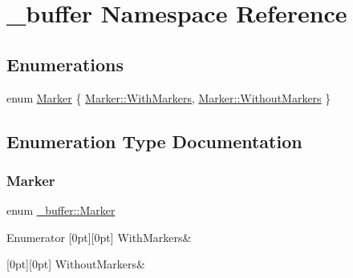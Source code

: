 \hypertarget{namespace__buffer}{}\section{\+\_\+buffer Namespace Reference}
\label{namespace__buffer}
\subsection*{Enumerations}
\begin{DoxyCompactItemize}
\item 
enum \hyperlink{namespace__buffer_ab9ca26b00f8b1794297a50a6356760cc}{Marker} \{ \newline
\hyperlink{namespace__buffer_ab9ca26b00f8b1794297a50a6356760cca716141cb6d114cdac427611aa530511d}{Marker\+::\+With\+Markers}, 
\newline
\hyperlink{namespace__buffer_ab9ca26b00f8b1794297a50a6356760cca5be8addefd7b42f7870c16427c1b5491}{Marker\+::\+Without\+Markers}
 \}
\end{DoxyCompactItemize}


\subsection{Enumeration Type Documentation}
\hypertarget{namespace__buffer_ab9ca26b00f8b1794297a50a6356760cc}{}\label{namespace__buffer_ab9ca26b00f8b1794297a50a6356760cc} 
\subsubsection{\texorpdfstring{Marker}{Marker}}
{\footnotesize\ttfamily enum \hyperlink{namespace__buffer_ab9ca26b00f8b1794297a50a6356760cc}{\+\_\+buffer\+::\+Marker}\hspace{0.3cm}{\ttfamily [strong]}}

\begin{DoxyEnumFields}{Enumerator}
[0pt][0pt]{}\hypertarget{namespace__buffer_ab9ca26b00f8b1794297a50a6356760cca716141cb6d114cdac427611aa530511d}{}\label{namespace__buffer_ab9ca26b00f8b1794297a50a6356760cca716141cb6d114cdac427611aa530511d} 
With\+Markers&\\
\hline

[0pt][0pt]{}\hypertarget{namespace__buffer_ab9ca26b00f8b1794297a50a6356760cca5be8addefd7b42f7870c16427c1b5491}{}\label{namespace__buffer_ab9ca26b00f8b1794297a50a6356760cca5be8addefd7b42f7870c16427c1b5491} 
Without\+Markers&\\
\hline

\end{DoxyEnumFields}
